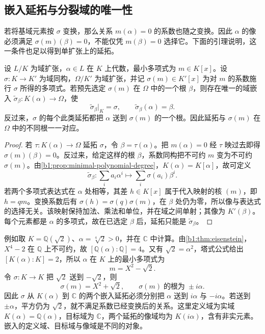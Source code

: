 \subsection{嵌入延拓与分裂域的唯一性}
\label{b1:subsec:1501:02}

若将基域元素按 \(\sigma\) 变换，那么关系 \(m(\alpha)=0\) 的系数也随之变换。因此 \(\alpha\) 的像必须满足 \(\sigma(m)(\beta)=0\)，不能仅凭 \(m(\beta)=0\) 选择它。下面的引理说明，这一条件也足以得到单扩张上的延拓。

\begin{lemma}\label{b1:lem:simple-embedding-extension}
	设 \(L/K\) 为域扩张，\(\alpha\in L\) 在 \(K\) 上代数，最小多项式为 \(m\in K[x]\)。设 \(\sigma:K\rightarrow K'\) 为域同构，\(\Omega/K'\) 为域扩张，并记 \(\sigma(m)\in K'[x]\) 为对 \(m\) 的系数施行 \(\sigma\) 所得的多项式。若预先选定 \(\sigma(m)\) 在 \(\Omega\) 中的一个根 \(\beta\)，则存在唯一的域嵌入 \(\widetilde\sigma_\beta:K(\alpha)\rightarrow\Omega\)，使
	\[
		\widetilde\sigma_\beta|_K=\sigma,\qquad \widetilde\sigma_\beta(\alpha)=\beta.
	\]
	反过来，\(\sigma\) 的每个此类延拓都把 \(\alpha\) 送到 \(\sigma(m)\) 的一个根。因此延拓与 \(\sigma(m)\) 在 \(\Omega\) 中的不同根一一对应。
\end{lemma}
\begin{proof}
	若 \(\tau:K(\alpha)\rightarrow\Omega\) 延拓 \(\sigma\)，令 \(\beta=\tau(\alpha)\)。把 \(m(\alpha)=0\) 经 \(\tau\) 映过去即得 \(\sigma(m)(\beta)=0\)。反过来，给定这样的根 \(\beta\)，系数同构把不可约 \(m\) 变为不可约 \(\sigma(m)\)。由\cref{b1:prop:minimal-polynomial-degree}，\(K(\alpha)=K[\alpha]\)，故可定义
	\[
		\widetilde\sigma_\beta:\sum_i a_i\alpha^i\longmapsto\sum_i\sigma(a_i)\beta^i.
	\]
	若两个多项式表达式在 \(\alpha\) 处相等，其差 \(h\in K[x]\) 属于代入映射的核 \((m)\)，即 \(h=qm\)。变换系数后有 \(\sigma(h)=\sigma(q)\sigma(m)\)，在 \(\beta\) 处仍为零，所以像与表达式的选择无关。该映射保持加法、乘法和单位，并在域之间单射；其像为 \(K'(\beta)\)。每个元素都是 \(\alpha\) 的多项式，故在已选定 \(\beta\) 后，延拓只能是 \(\widetilde\sigma_\beta\)。
\end{proof}

例如取 \(K=\mathbb Q(\sqrt2)\)、\(\alpha=\sqrt[4]2>0\)，并在 \(\mathbb C\) 中计算。由\cref{b1:thm:eisenstein}，\(X^4-2\) 在 \(\mathbb Q\) 上不可约，故 \([\mathbb Q(\alpha):\mathbb Q]=4\)。又有 \(\sqrt2=\alpha^2\)，塔式公式给出 \([K(\alpha):K]=2\)，所以 \(\alpha\) 在 \(K\) 上的最小多项式为
\[
	m=X^2-\sqrt2.
\]
令 \(\sigma:K\rightarrow K\) 把 \(\sqrt2\) 送到 \(-\sqrt2\)，则
\[
	\sigma(m)=X^2+\sqrt2, \qquad \sigma(m)\;\text{的根为}\;\pm i\alpha.
\]
因此 \(\sigma\) 从 \(K(\alpha)\) 到 \(\mathbb C\) 的两个嵌入延拓必须分别把 \(\alpha\) 送到 \(i\alpha\) 与 \(-i\alpha\)。若送到 \(\pm\alpha\)，平方仍为 \(\sqrt2\)，就不满足系数已经变换后的关系。这里定义域为实域 \(K(\alpha)=\mathbb Q(\alpha)\)，目标域为 \(\mathbb C\)，两个延拓的像域均为 \(K(i\alpha)\)，含有非实元素。嵌入的定义域、目标域与像域是不同的对象。

